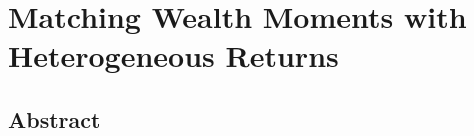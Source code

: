 \chapter{Matching Wealth Moments with Heterogeneous Returns}
\label{chap:matching-wealth-moments}

\begingroup
\singlespacing
\section*{Abstract}

\endgroup





\FloatBarrier

\FloatBarrier

\clearpage


